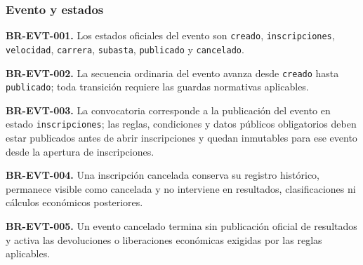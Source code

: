 \documentclass[10pt,letterpaper]{article}
\begin{document}
\subsubsection{Evento y estados}
\noindent\textbf{BR-EVT-001.} Los estados oficiales del evento son \texttt{creado}, \texttt{inscripciones}, \texttt{velocidad}, \texttt{carrera}, \texttt{subasta}, \texttt{publicado} y \texttt{cancelado}.\par
\noindent\textbf{BR-EVT-002.} La secuencia ordinaria del evento avanza desde \texttt{creado} hasta \texttt{publicado}; toda transición requiere las guardas normativas aplicables.\par
\noindent\textbf{BR-EVT-003.} La convocatoria corresponde a la publicación del evento en estado \texttt{inscripciones}; las reglas, condiciones y datos públicos obligatorios deben estar publicados antes de abrir inscripciones y quedan inmutables para ese evento desde la apertura de inscripciones.\par
\noindent\textbf{BR-EVT-004.} Una inscripción cancelada conserva su registro histórico, permanece visible como cancelada y no interviene en resultados, clasificaciones ni cálculos económicos posteriores.\par
\noindent\textbf{BR-EVT-005.} Un evento cancelado termina sin publicación oficial de resultados y activa las devoluciones o liberaciones económicas exigidas por las reglas aplicables.\par
\end{document}
